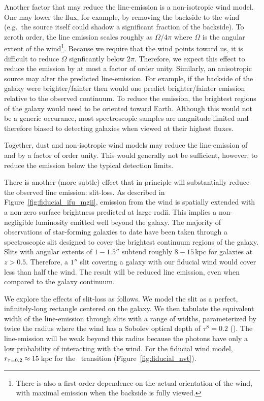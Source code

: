 \documentclass[12pt,preprint]{aastex}
\begin{document}
Another factor that may reduce the line-emission is a
non-isotropic wind model. One may lower the flux, for example,  by
removing the backside to the wind (e.g.\ the source itself could
shadow a significant fraction of the backside).  To zeroth order, the line emission scales
roughly as $\Omega/4\pi$ where $\Omega$ is the angular extent of the
wind\footnote{There is also a first order dependence on the actual
  orientation of the wind, with maximal emission when the backside is
  fully viewed.}.  Because we require that the wind 
points toward us, it is difficult to reduce $\Omega$ signficantly
below $2 \pi$.  Therefore, we expect this effect to reduce the
emission by at most a factor of order unity.  
Similarly, an anisotropic source may alter the predicted
line-emission.  For example, if the backside of the galaxy were
brighter/fainter then would one predict brighter/fainter emission
relative to the observed continuum.
To reduce the emission, the brightest regions
of the galaxy would need to be oriented toward Earth.  Although this
would not be a
generic occurance, most spectroscopic samples are magnitude-limited
and therefore biased to detecting galaxies when viewed at their
highest fluxes.

Together, dust and non-isotropic wind models may reduce the line-emission
of  and 
by a factor of order unity.  This would generally
not be sufficient, however, to reduce the emission below the typical detection
limits. 

There is another (more subtle) effect that in principle will
substantially reduce the observed line emission: slit-loss.  As
described in Figure~\ref{fig:fiducial_ifu_mgii}, 
emission from the wind is spatially extended with
a non-zero surface brightness predicted at large radii. This implies 
a non-negligible luminosity emitted well beyond the galaxy.  
The majority of observations of star-forming galaxies to date have
been taken through a spectroscopic slit designed to cover
the brightest continuum regions of the galaxy. Slits with angular
extents of $1-1.5''$ subtend roughly $8-15$\,kpc for galaxies at $z>0.5$.
Therefore, a $1''$ slit covering a galaxy with our fiducial wind would cover
less than half the wind.  The result will be reduced line emission,
even when compared to the galaxy continuum.

We explore the effects of slit-loss as follows.
We model the slit as a perfect, infinitely-long rectangle centered on the
galaxy.  We then tabulate the equivalent width of the line-emission
through slits with a range of widths, parameterized by twice the radius
where the wind has a Sobolev optical depth of $\tau^S = 0.2$ (\rtt).
The line-emission will be weak beyond
this radius because the photons have only a low probability of
interacting with the wind.  For the fiducial wind model, $r_{\tau = 0.2}
\approx 15$\,kpc for the \mgiia\ transition (Figure~\ref{fig:fiducial_nvt}).  
\end{document}
